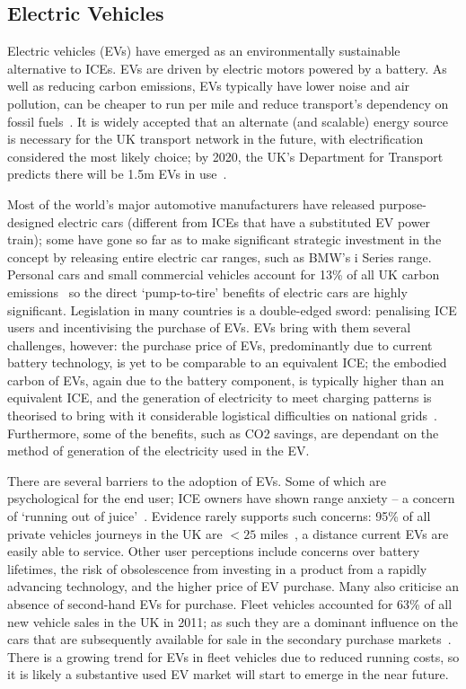 \documentclass[b5paper,10pt]{article}
\begin{document}
\subsection{Electric Vehicles}

Electric vehicles (EVs) have emerged as an environmentally sustainable
alternative to ICEs. EVs are driven by electric motors powered by a
battery. As well as reducing carbon emissions, EVs typically have
lower noise and air pollution, can be cheaper to run per mile and
reduce transport's dependency on fossil fuels~\citep{postevs:2010}. It
is widely accepted that an alternate (and scalable) energy source is
necessary for the UK transport network in the future, with
electrification considered the most likely choice; by 2020, the UK's
Department for Transport predicts there will be 1.5m EVs in
use~\cite{dft:2008}.

Most of the world's major automotive manufacturers have released
purpose-designed electric cars (different from ICEs that have a
substituted EV power train); some have gone so far as to make
significant strategic investment in the concept by releasing entire
electric car ranges, such as BMW's i Series range. Personal cars and
small commercial vehicles account for 13\% of all UK carbon
emissions~\citep{lumsden:2012} so the direct `pump-to-tire' benefits of
electric cars are highly significant. Legislation in many countries is
a double-edged sword: penalising ICE users and incentivising the
purchase of EVs. EVs bring with them several challenges, however: the
purchase price of EVs, predominantly due to current battery
technology, is yet to be comparable to an equivalent ICE; the embodied
carbon of EVs, again due to the battery component, is typically higher
than an equivalent ICE, and the generation of electricity to meet
charging patterns is theorised to bring with it considerable
logistical difficulties on national
grids~\citep{su-et-al:2011,akhavan-rezai-et-al:2015}. Furthermore, some
of the benefits, such as CO2 savings, are dependant on the method of
generation of the electricity used in the EV.

There are several barriers to the adoption of EVs. Some of which are
psychological for the end user; ICE owners have shown range anxiety --
a concern of `running out of
juice'~\citep{oflev:2011,yilmaz+krein:2012}. Evidence rarely supports
such concerns: 95\% of all private vehicles journeys in the UK are $<25$
miles~\citep{oflev:2011}, a distance current EVs are easily able to
service. Other user perceptions include concerns over battery
lifetimes, the risk of obsolescence from investing in a product from a
rapidly advancing technology, and the higher price of EV purchase.
Many also criticise an absence of second-hand EVs for purchase. Fleet
vehicles accounted for 63\% of all new vehicle sales in the UK in
2011; as such they are a dominant influence on the cars that are
subsequently available for sale in the secondary purchase
markets~\citep{fleets:2012}. There is a growing trend for EVs in fleet
vehicles due to reduced running costs, so it is likely a substantive
used EV market will start to emerge in the near future.
\end{document}
